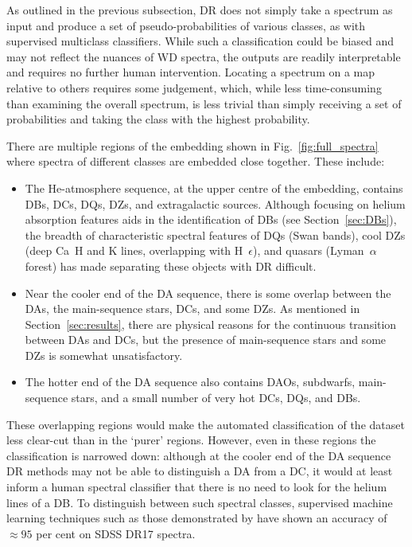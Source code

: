 \documentclass[fleqn,usenatbib]{mnras}
\begin{document}
As outlined in the previous subsection, DR does not simply take a spectrum as input and produce a set of pseudo-probabilities of various classes, as with supervised multiclass classifiers.
While such a classification could be biased and may not reflect the nuances of WD spectra, the outputs are readily interpretable and requires no further human intervention.
Locating a spectrum on a map relative to others requires some judgement, which, while less time-consuming than examining the overall spectrum, is less trivial than simply receiving a set of probabilities and taking the class with the highest probability.

There are multiple regions of the embedding shown in Fig.~\ref{fig:full_spectra} where spectra of different classes are embedded close together.
These include:
\begin{itemize}
\item
The He-atmosphere sequence, at the upper centre of the embedding, contains DBs, DCs, DQs, DZs, and extragalactic sources.
Although focusing on helium absorption features aids in the identification of DBs (see Section~\ref{sec:DBs}), the breadth of characteristic spectral features of DQs (Swan bands), cool DZs (deep Ca~H and K lines, overlapping with H~$\epsilon$), and quasars (Lyman~$\alpha$ forest) has made separating these objects with DR difficult.
\item
Near the cooler end of the DA sequence, there is some overlap between the DAs, the main-sequence stars, DCs, and some DZs.
As mentioned in Section~\ref{sec:results}, there are physical reasons for the continuous transition between DAs and DCs, but the presence of main-sequence stars and some DZs is somewhat unsatisfactory.
\item
The hotter end of the DA sequence also contains DAOs, subdwarfs, main-sequence stars, and a small number of very hot DCs, DQs, and DBs.
\end{itemize}
These overlapping regions would make the automated classification of the dataset less clear-cut than in the `purer' regions.
However, even in these regions the classification is narrowed down: although at the cooler end of the DA sequence DR methods may not be able to distinguish a DA from a DC, it would at least inform a human spectral classifier that there is no need to look for the helium lines of a DB.
To distinguish between such spectral classes, supervised machine learning techniques such as those demonstrated by \citet{vincent23} have shown an accuracy of $\approx 95$ per cent on SDSS DR17 spectra.
\end{document}

